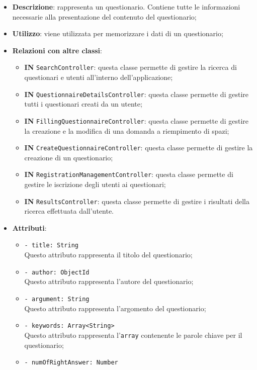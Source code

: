 		\begin{itemize}
			\item \textbf{Descrizione}: rappresenta un questionario. Contiene tutte le informazioni necessarie alla presentazione del contenuto del questionario;
			\item \textbf{Utilizzo}: viene utilizzata per memorizzare i dati di un questionario;
			\item \textbf{Relazioni con altre classi}: 
			\begin{itemize}
				\item \textbf{IN} \texttt{SearchController}: questa classe permette di gestire la ricerca di questionari e utenti all'interno dell'applicazione;
				\item \textbf{IN} \texttt{QuestionnaireDetailsController}: questa classe permette di gestire tutti i questionari creati da un utente; 
				\item \textbf{IN} \texttt{FillingQuestionnaireController}: questa classe permette di gestire la creazione e la modifica di una domanda a riempimento di spazi;
				\item \textbf{IN} \texttt{CreateQuestionnaireController}: questa classe permette di gestire la creazione di un questionario;
				\item \textbf{IN} \texttt{RegistrationManagementController}: questa classe permette di gestire le iscrizione degli utenti ai questionari;
				\item \textbf{IN} \texttt{ResultsController}: questa classe permette di gestire i risultati della ricerca effettuata dall'utente.
			\end{itemize}
			\item \textbf{Attributi}: 
			\begin{itemize}
				\item \texttt{- title: String}\\
				Questo attributo rappresenta il titolo del questionario;
				\item \texttt{- author: ObjectId}\\
				Questo attributo rappresenta l'autore del questionario;
				\item \texttt{- argument: String}\\
				Questo attributo rappresenta l'argomento del questionario;
				\item \texttt{- keywords: Array<String>}\\
				Questo attributo rappresenta l'\texttt{array} contenente le parole chiave per il questionario;
				\item \texttt{- numOfRightAnswer: Number}\\

\end{itemize}
\end{itemize}
